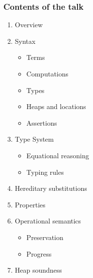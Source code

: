 \documentclass[xcolor=dvipsnames,9pt,hide notes,mathserif]{beamer}
\begin{document}




\begin{frame}
  \frametitle{Contents of the talk}
  \begin{enumerate} 
  \item Overview
  \item Syntax
    \begin{itemize}
    \item Terms
    \item Computations
    \item Types
    \item Heaps and locations
    \item Assertions
    \end{itemize}
  \item Type System
    \begin{itemize}
    \item Equational reasoning
    \item Typing rules
    \end{itemize}
  \item Hereditary substitutions
  \item Properties
  \item Operational semantics
    \begin{itemize}
    \item Preservation
    \item Progress
    \end{itemize}
  \item Heap soundness
  \end{enumerate}
\end{frame}
\end{document}
